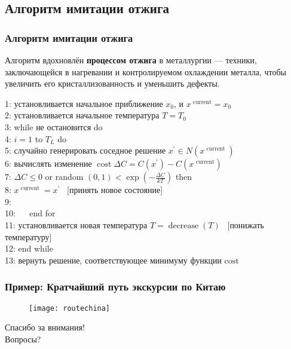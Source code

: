 \documentclass[aspectratio=1610]{beamer}
\begin{document}
\subsection{Алгоритм имитации отжига}
	\begin{frame}
		\frametitle{Алгоритм имитации отжига}
		Алгоритм вдохновлён \textbf{процессом отжига} в металлургии — техники, заключающейся в нагревании и контролируемом охлаждении металла, чтобы увеличить его кристаллизованность и уменьшить дефекты.
		
		1: установливается начальное приближение $x_{0}$, и $x^{\text{ current}}=x_{0}$\\ 
		2: установливается начальное температура  $T=T_{0}$\\ 
		3: {\color{red} while} не остановится {\color{red} do}\\
		4:   $i=1$ to $T_{L}$ {\color{red}do}\\
		5: \quad \quad  случайно генерировать соседное решение $x^{\prime} \in N\left(x^{\text { current }}\right)$ \\
		6: \quad \quad вычислять изменение  $\operatorname{cost} \Delta C=C\left(x^{\prime}\right)-C\left(x^{\text{  current}}\right)$ \\
		7: \quad {}  $\Delta C \leq 0$  {\color{red}or} random  $(0,1)<\exp \left(-\frac{\Delta C}{k T}\right)$  {\color{red} then}\\
		8: \quad \quad \quad $x^{\text{ current }}=x^{\prime}$\ {\color{blue} [принять новое состояние] }\\ 
		9: \quad \quad {\color{red} end if}\\
		10: \ \ {\color{red} end for}\\
		11: \quad \quad установливается новая температура  $T=\operatorname{decrease}(T)$\ {\color{blue}  [понижать температуру] } \\
		12: {\color{red} end while}\\
		13: вернуть решение, соответствующее минимуму функции $\text{cost}$\\
		
	\end{frame} 
	
  
	\begin{frame}
	\frametitle{Пример: Кратчайший путь экскурсии по Китаю}
		\begin{figure}[h]
			\centering
			\texttt{[image: routechina]}
		\end{figure}

	\end{frame}

	\begin{frame}[focus]
        Спасибо за внимания! \\
        Вопросы?
	\end{frame}
\end{document}
